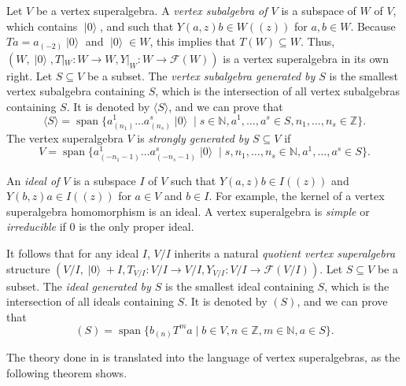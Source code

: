 \documentclass[a4paper, 12pt, reqno]{amsart}
\theoremstyle{remark}
\DeclareMathOperator{\vspan}{span}
\DeclareMathOperator{\vac}{|0\rangle}
\begin{document}
Let $V$ be a vertex superalgebra.
A \emph{vertex subalgebra of $V$} is a subspace of $W$ of $V$, which contains $\vac$, and such that $Y(a, z)b \in W((z))$ for $a, b \in W$.
Because $Ta = a_{(-2)}\vac$ and $\vac \in W$, this implies that $T(W) \subseteq W$.
Thus, $(W, \vac, T|_{W}: W \to W, Y|_{W}: W \to \mathcal{F}(W))$ is a vertex superalgebra in its own right.
Let $S \subseteq V$ be a subset.
The \emph{vertex subalgebra generated by $S$} is the smallest vertex subalgebra containing $S$, which is the intersection of all vertex subalgebras containing $S$.
It is denoted by $\langle S \rangle$, and we can prove that
\begin{equation*}
  \langle S \rangle = \vspan\{a^1_{(n_1)}\dots a^s_{(n_s)}\vac \mid s \in \mathbb{N}, a^1, \dots, a^s \in S, n_1, \dots, n_s \in \mathbb{Z}\}.
\end{equation*}
The vertex superalgebra $V$ is \emph{strongly generated by $S \subseteq V$} if
\begin{equation*}
  V = \vspan\{a^1_{(-n_1 - 1)}\dots a^s_{(-n_s - 1)}\vac \mid s, n_1, \dots, n_s \in \mathbb{N}, a^1, \dots, a^s \in S\}.
\end{equation*}

An \emph{ideal of $V$} is a subspace $I$ of $V$ such that $Y(a, z)b \in I((z))$ and $Y(b, z)a \in I((z))$ for $a \in V$ and $b \in I$.
For example, the kernel of a vertex superalgebra homomorphism is an ideal.
A vertex superalgebra is \emph{simple} or \emph{irreducible} if $0$ is the only proper ideal.

It follows that for any ideal $I$, $V/I$ inherits a natural \emph{quotient vertex superalgebra} structure $(V/I, \vac + I, T_{V/I}: V/I \to V/I, Y_{V/I}: V/I \to \mathcal{F}(V/I))$.
Let $S \subseteq V$ be a subset.
The \emph{ideal generated by $S$} is the smallest ideal containing $S$, which is the intersection of all ideals containing $S$.
It is denoted by $(S)$, and we can prove that
\begin{equation*}
  (S) = \vspan\{b_{(n)}T^ma \mid b \in V, n \in \mathbb{Z}, m \in \mathbb{N}, a \in S\}.
\end{equation*}

The theory done in  is translated into the language of vertex superalgebras, as the following theorem shows.
\end{document}
